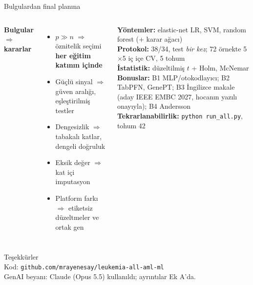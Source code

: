 \documentclass[aspectratio=169,11pt]{beamer}
\begin{document}
\begin{frame}{Bulgulardan final planına}
\begin{columns}[T]
\small
\textbf{Bulgular $\Rightarrow$ kararlar}
\begin{itemize}
\item $p\gg n$ $\Rightarrow$ öznitelik seçimi \textbf{her eğitim katının içinde}
\item Güçlü sinyal $\Rightarrow$ güven aralığı, eşleştirilmiş testler
\item Dengesizlik $\Rightarrow$ tabakalı katlar, dengeli doğruluk
\item Eksik değer $\Rightarrow$ kat içi imputasyon
\item Platform farkı $\Rightarrow$ etiketsiz düzeltmeler ve ortak \CommonAll{} gen
\end{itemize}
\small
\textbf{Yöntemler:} elastic-net LR, SVM, random forest (+ karar ağacı)\\[1mm]
\textbf{Protokol:} 38/34, test \emph{bir kez}; 72 örnekte 5$\times$5 iç içe CV, 5 tohum\\[1mm]
\textbf{İstatistik:} düzeltilmiş $t$ + Holm, McNemar\\[1mm]
\textbf{Bonuslar:} B1 MLP/otokodlayıcı; B2 TabPFN, GenePT; B3 İngilizce makale (aday IEEE EMBC 2027, hocanın yazılı onayıyla); B4 Andersson\\[1mm]
\textbf{Tekrarlanabilirlik:} \texttt{python run\_all.py}, tohum 42
\end{columns}
\end{frame}

\begin{frame}
\centering\Large Teşekkürler\\[4mm]
\normalsize Kod: \texttt{github.com/mrayenesay/leukemia-all-aml-ml}\\[2mm]
\small GenAI beyanı: Claude (Opus 5.5) kullanıldı; ayrıntılar Ek A'da.
\end{frame}
\end{document}
